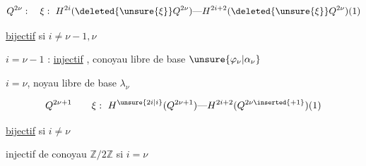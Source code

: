 \[
Q^{2\nu}:\quad \xi:\ H^{2i}(\deleted{\unsure{\xi}}Q^{2\nu})
\text{---}H^{2i+2}(\deleted{\unsure{\xi}}Q^{2\nu})(1)
\]
    
\uline{bijectif} si $i\neq\nu-1,\nu$

$i=\nu-1$ : \uline{injectif} , conoyau libre de base $\unsure{\varphi_\nu|\alpha_\nu}$

$i=\nu$\qquad {}, noyau libre de base $\lambda_\nu$

\[
Q^{2\nu+1}\qquad \xi:\ H^{\unsure{2i|i}}(Q^{2\nu+1})\text{---}
H^{2i+2}(Q^{2\nu\inserted{+1}})(1)
\]

\uline{bijectif} si $i\neq\nu$

injectif de conoyau $\mathbb Z/2\mathbb Z$ si $i=\nu$
